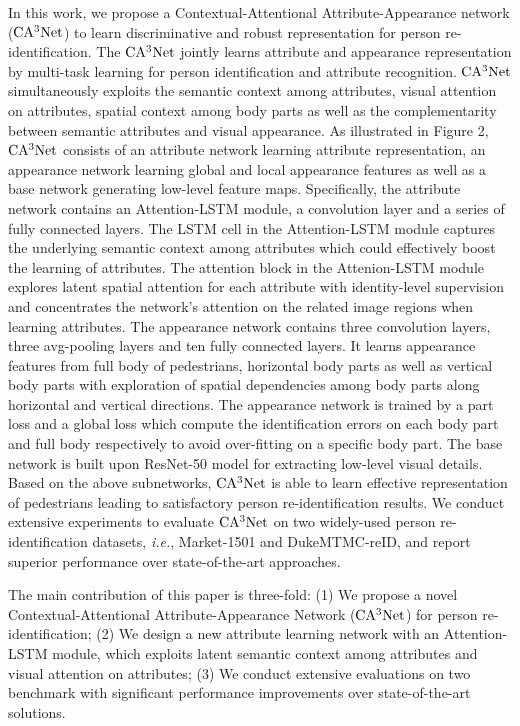 \documentclass[sigconf]{acmart}
\begin{document}
In this work, we propose a Contextual-Attentional Attribute-Appearance network ($\rm CA^3Net$) to learn discriminative and robust representation for person re-identification. The $\rm CA^3Net$ jointly learns attribute and appearance representation by multi-task learning for person identification and attribute recognition. $\rm CA^3Net$ simultaneously exploits the semantic context among attributes, visual attention on attributes, spatial context among body parts as well as the complementarity  between semantic attributes and visual appearance. As illustrated in Figure 2, $\rm CA^3Net$ consists of an attribute network learning attribute representation, an appearance network learning global and local appearance features as well as a base network generating low-level feature maps. Specifically, the attribute network contains an Attention-LSTM module, a convolution layer and a series of fully connected layers. The LSTM cell \cite{49} in the Attention-LSTM module captures the underlying semantic context among attributes which could effectively boost the learning of attributes. The attention block in the Attenion-LSTM module explores latent spatial attention for each attribute with identity-level supervision and concentrates the network's attention on the related image regions when learning attributes. The appearance network contains three convolution layers, three avg-pooling layers and ten fully connected layers. It learns appearance features from full body of pedestrians, horizontal body parts as well as vertical body parts with exploration of spatial dependencies among body parts along horizontal and vertical directions. The appearance network is trained by a part loss and a global loss which compute the identification errors on each body part and full body respectively to avoid over-fitting on a specific body part. The base network is built upon ResNet-50 \cite{13} model for extracting low-level visual details. Based on the above subnetworks, $\rm CA^3Net$ is able to learn effective representation of pedestrians leading to satisfactory person re-identification results. We conduct extensive experiments to evaluate $\rm CA^3Net$ on two widely-used person re-identification datasets, \textit{i.e.}, Market-1501 and DukeMTMC-reID, and report superior performance over state-of-the-art approaches.

The main contribution of this paper is three-fold: (1) We propose a novel Contextual-Attentional Attribute-Appearance Network ($\rm CA^3Net$) for person re-identification; (2) We design a new attribute learning network with an Attention-LSTM module, which exploits latent semantic context among attributes and visual attention on attributes; (3) We conduct extensive evaluations on two benchmark with significant performance improvements over state-of-the-art solutions.
\end{document}
